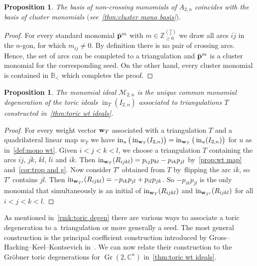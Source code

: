 \documentclass[10pt,a4paper]{amsart}
\newcommand{\thlabel}[1]{\label{#1}}
\newcommand{\thref}[1]{\ref{#1}}
\newtheorem{Proposition}[Theorem]{Proposition}
\numberwithin{equation}{section}
\DeclareMathOperator{\init}{in}
\DeclareMathOperator{\Gr}{Gr}
\begin{document}
\begin{Proposition}\thlabel{cluster vs SM basis}
The basis of non-crossing monomials of $A_{2,n}$ coincides with the basis of cluster monomials $($see~\thref{thm:cluster mono basis}$)$.
\end{Proposition}

\begin{proof}
For every standard monomial $\bar{\bf p}^m$ with $m\in \mathbb Z_{\ge 0}^{\binom{n}{2}}$ we draw all arcs $\overline{ij}$ in the $n$-gon, for which $m_{ij}\not =0$.
By definition there is no pair of crossing arcs.
Hence, the set of arcs can be completed to a triangulation and $\bar{\bf p}^m$ is a cluster monomial for the corresponding seed. On the other hand, every cluster monomial is contained in $\mathbb B_{<}$ which completes the proof.
\end{proof}

\begin{Proposition}\thlabel{prop:unique mono ideal}
The monomial ideal $\mathcal M_{2,n}$ is the unique common monomial degeneration of the toric ideals $\init_{T}(I_{2,n})$ associated to triangulations $T$ constructed in~\thref{thm:toric wt ideals}.
\end{Proposition}
\begin{proof}
For every weight vector ${\bf w}_T$ associated with a triangulation $T$ and a quadrilateral linear map $w_T$ we have $\init_u\big(\init_{{\bf w}_T}(I_{2,n})\big)=\init_{{\bf w}_T}\big(\init_u(I_{2,n})\big)$ for $u$ as in~\thref{def:mono wt}.
Given $i<j<k<l$, we choose a triangulation $T$ containing the arcs $\overline{ij}$, $\overline{jk}$, $\overline{kl}$, $\overline{li}$ and $\overline{ik}$.
Then $\init_{{\bf w}_T}(R_{ijkl})=p_{ij}p_{kl}-p_{ik}p_{jl}$ by~\thref{prop:wt map} and~\thref{cor:trop and g}.
Now consider $T'$ obtained from $T$ by~flipping the arc $\overline{ik}$, so $T'$ contains $\overline{jl}$.
Then $\init_{{\bf w}_{T'}}(R_{ijkl})=-p_{ik}p_{jl}+p_{il}p_{jk}$.
So $-p_{ik}p_{jl}$ is the only monomial that simultaneously is an initial of $\init_{{\bf w}_{T}}(R_{ijkl})$ and $\init_{{\bf w}_{T'}}(R_{ijkl})$ for all $i<j<k<l$.
\end{proof}

As mentioned in~\thref{rmk:toric degen} there are various ways to associate a toric degeneration to a~triangulation or more generally a seed.
The most general construction is the principal coefficient construction introduced by Gross--Hacking--Keel--Kontsevich in~\cite[Section~8]{GHKK}.
We can now relate their construction to the Gr\"obner toric degenerations for $\Gr(2,\mathbb C^n)$ in~\thref{thm:toric wt ideals}.
\end{document}

